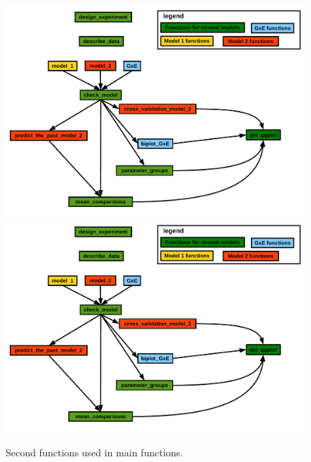 \documentclass{article}\usepackage[]{graphicx}\usepackage[]{color}
\begin{document}
\begin{figure}[H]
\begin{center}
\includegraphics[width=\textwidth,page=2]{PBBstats_function_relations}
\includegraphics[width=\textwidth,page=3]{PBBstats_function_relations}
\end{center}
\caption{Second functions used in main functions.}
\label{workflow_2}
\end{figure}
\end{document}
